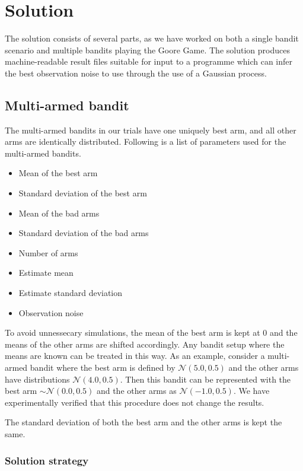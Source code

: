 \chapter{Solution}
\label{ch:solution}

The solution consists of several parts, as we have worked on both a single bandit scenario and multiple bandits playing the Goore Game.
The solution produces machine-readable result files suitable for input to a programme which can infer the best observation noise to use through the use of a Gaussian process.

\section{Multi-armed bandit}

The multi-armed bandits in our trials have one uniquely best arm, and all other arms are identically distributed.
Following is a list of parameters used for the multi-armed bandits.
\begin{itemize}
    \item Mean of the best arm
    \item Standard deviation of the best arm
    \item Mean of the bad arms
    \item Standard deviation of the bad arms
    \item Number of arms
    \item Estimate mean
    \item Estimate standard deviation
    \item Observation noise
\end{itemize}

To avoid unnessecary simulations, the mean of the best arm is kept at 0 and the means of the other arms are shifted accordingly.
Any bandit setup where the means are known can be treated in this way.
As an example, consider a multi-armed bandit where the best arm is defined by $\mathcal{N}(5.0, 0.5)$ and the other arms have distributions $\mathcal{N}(4.0,0.5)$.
Then this bandit can be represented with the best arm $\sim\mathcal{N}(0.0, 0.5)$ and the other arms as $\mathcal{N}(-1.0, 0.5)$.
We have experimentally verified that this procedure does not change the results.

The standard deviation of both the best arm and the other arms is kept the same.

\subsection{Solution strategy}

